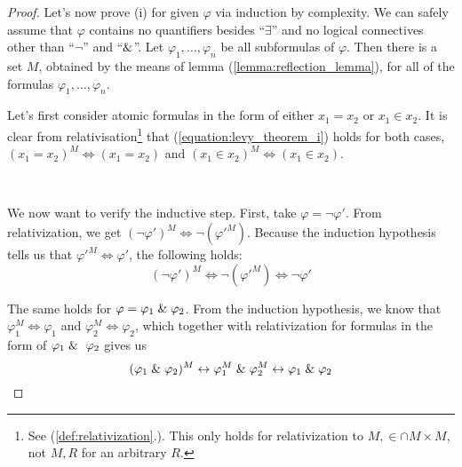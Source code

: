 \begin{proof}
Let's now prove (i) for given $\varphi$ via induction by complexity. We can safely assume that $\varphi$ contains no quantifiers besides ``$\exists$'' and no logical connectives other than ``$\neg$'' and ``$\mathrel{\&}$''.
Let $\varphi_1, \ldots, \varphi_n$ be all subformulas of $\varphi$. Then there is a set $M$, obtained by the means of lemma (\ref{lemma:reflection_lemma}), for all of the formulas $\varphi_1, \ldots, \varphi_n$. 

Let's first consider atomic formulas in the form of either $x_1 = x_2$ or $x_1 \in x_2$. %
It is clear from relativisation\footnote{See (\ref{def:relativization}.). This only holds for relativization to $M, \in \cap M \times M$, not $M, R$ for an arbitrary $R$.} that (\ref{equation:levy_theorem_i}) holds for both cases, $(x_1 = x_2)^M \iff (x_1 = x_2)$ and $(x_1 \in x_2)^M \iff (x_1 \in x_2)$.

\

We now want to verify the inductive step. First, take $\varphi = \neg \varphi'$. From relativization, we get $(\neg \varphi')^M \iff \neg (\varphi'^M)$.
Because the induction hypothesis tells us that $\varphi'^M \iff \varphi'$, the following holds:
\begin{equation}
(\neg \varphi')^{M} \iff \neg (\varphi'^M) \iff \neg \varphi'
\end{equation}

The same holds for $\varphi = \varphi_1 \mathrel{\&} \varphi_2$. From the induction hypothesis, we know that $\varphi_1^M \iff \varphi_1$ and $\varphi_2^M \iff \varphi_2$, which together with relativization for formulas in the form of $\varphi_1 \et \varphi_2$ gives us
\begin{equation}
(\varphi_1 \mathrel{\&} \varphi_2)^M \leftrightarrow \varphi_1^M \mathrel{\&} \varphi_2^M \leftrightarrow \varphi_1 \mathrel{\&} \varphi_2
\end{equation}


\end{proof}
